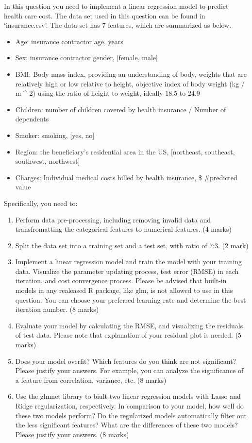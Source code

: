 \documentclass[
]{article}
\providecommand{\tightlist}{%
  \setlength{\itemsep}{0pt}\setlength{\parskip}{0pt}}
\begin{document}
In this question you need to implement a linear regression model to
predict health care cost. The data set used in this question can be
found in `insurance.csv'. The data set has 7 features, which are
summarized as below.

\begin{itemize}
\tightlist
\item
  Age: insurance contractor age, years
\item
  Sex: insurance contractor gender, {[}female, male{]}
\item
  BMI: Body mass index, providing an understanding of body, weights that
  are relatively high or low relative to height, objective index of body
  weight (kg / m \^{} 2) using the ratio of height to weight, ideally
  18.5 to 24.9
\item
  Children: number of children covered by health insurance / Number of
  dependents
\item
  Smoker: smoking, {[}yes, no{]}
\item
  Region: the beneficiary's residential area in the US, {[}northeast,
  southeast, southwest, northwest{]}
\item
  Charges: Individual medical costs billed by health insurance, \$
  \#predicted value
\end{itemize}

Specifically, you need to:

\begin{enumerate}
\def\labelenumi{\arabic{enumi}.}
\tightlist
\item
  Perform data pre-processing, including removing invalid data and
  transfromatting the categorical features to numerical features. (4
  marks)
\item
  Split the data set into a training set and a test set, with ratio of
  7:3. (2 mark)
\item
  Implement a linear regression model and train the model with your
  training data. Visualize the parameter updating process, test error
  (RMSE) in each iteration, and cost convergence process. Please be
  advised that built-in models in any realeased R package, like glm, is
  not allowed to use in this question. You can choose your preferred
  learning rate and determine the best iteration number. (8 marks)
\item
  Evaluate your model by calculating the RMSE, and visualizing the
  residuals of test data. Please note that explanation of your residual
  plot is needed. (5 marks)
\item
  Does your model overfit? Which features do you think are not
  significant? Please justify your answers. For example, you can analyze
  the significance of a feature from correlation, variance, etc. (8
  marks)
\item
  Use the glmnet library to biult two linear regression models with
  Lasso and Ridge regularization, respectively. In comparison to your
  model, how well do these two models perform? Do the regularized models
  automatically filter out the less significant features? What are the
  differences of these two models? Please justify your answers. (8
  marks)
\end{enumerate}
\end{document}
